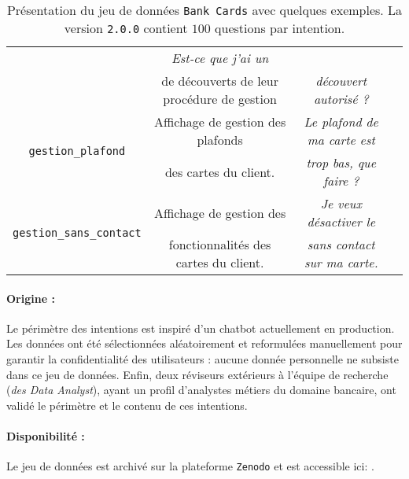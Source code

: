 \begin{table}[!htb]
\begin{center}
\begin{scriptsize}
\begin{tabular}{|c|c|c|c|}
					& \textit{Est-ce que j'ai un}
					\tabularnewline
					& de découverts de leur procédure de gestion
					& \textit{découvert autorisé ?}
					\tabularnewline
					\hline
				\multirow{2}{*}{\texttt{gestion\_plafond}}
					& Affichage de gestion des plafonds
					& \textit{Le plafond de ma carte est}
					\tabularnewline
					& des cartes du client.
					& \textit{trop bas, que faire ?}
					\tabularnewline
					\hline
				\multirow{2}{*}{\texttt{gestion\_sans\_contact}}
					& Affichage de gestion des
					& \textit{Je veux désactiver le}
					\tabularnewline
					& fonctionnalités des cartes du client.
					& \textit{sans contact sur ma carte.}
					\tabularnewline
					\hline
			\end{tabular}
			\end{scriptsize}
			\end{center}
			\caption{
				Présentation du jeu de données \texttt{Bank Cards} avec quelques exemples.
				La version \texttt{2.0.0} contient $100$ questions par intention.
			}
			\label{table:A.1-DATASET-BANK-CARDS}
		\end{table}
		
		\paragraph{Origine :}
		Le périmètre des intentions est inspiré d'un chatbot actuellement en production.
		Les données ont été sélectionnées aléatoirement et reformulées manuellement pour garantir la confidentialité des utilisateurs : aucune donnée personnelle ne subsiste dans ce jeu de données.
		Enfin, deux réviseurs extérieurs à l'équipe de recherche (\textit{des Data Analyst}), ayant un profil d'analystes métiers du domaine bancaire, ont validé le périmètre et le contenu de ces intentions.
		
		\paragraph{Disponibilité :}
		Le jeu de données est archivé sur la plateforme \texttt{Zenodo} et est accessible ici: \cite{schild:2022:french-trainset-chatbots}.


	\newpage
